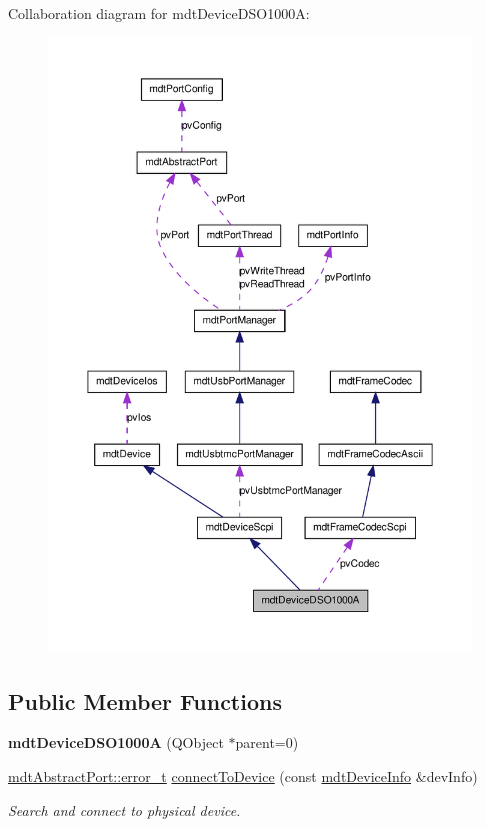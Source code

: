 Collaboration diagram for mdtDeviceDSO1000A:
\nopagebreak
\begin{figure}[H]
\begin{center}
\leavevmode
\includegraphics[width=400pt]{classmdt_device_d_s_o1000_a__coll__graph}
\end{center}
\end{figure}
\subsection*{Public Member Functions}
\begin{DoxyCompactItemize}
\item 
\hypertarget{classmdt_device_d_s_o1000_a_a3c4cd1418250864589284a3540353fdb}{
{\bfseries mdtDeviceDSO1000A} (QObject $\ast$parent=0)}
\label{classmdt_device_d_s_o1000_a_a3c4cd1418250864589284a3540353fdb}

\item 
\hyperlink{classmdt_abstract_port_ad4121bb930c95887e77f8bafa065a85e}{mdtAbstractPort::error\_\-t} \hyperlink{classmdt_device_d_s_o1000_a_a84431cf929750a8a25d5218893736c72}{connectToDevice} (const \hyperlink{classmdt_device_info}{mdtDeviceInfo} \&devInfo)
\begin{DoxyCompactList}\small\item\em Search and connect to physical device. \end{DoxyCompactList}\end{DoxyCompactItemize}


